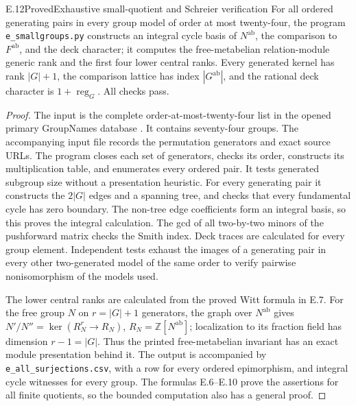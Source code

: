 \begin{statement}{E.12}{Proved}{Exhaustive small-quotient and Schreier verification}
For all ordered generating pairs in every group model of order
at most twenty-four, the program \texttt{e\_smallgroups.py}
constructs an integral cycle basis of $N^{\mathrm{ab}}$, the
comparison to $F^{\mathrm{ab}}$, and the deck character; it
computes the free-metabelian relation-module generic rank and
the first four lower central ranks. Every generated kernel has
rank $|G|+1$, the comparison lattice has index
$|G^{\mathrm{ab}}|$, and the rational deck character is
$1+\operatorname{reg}_G$. All checks pass.
\end{statement}
\begin{proof}
The input is the complete order-at-most-twenty-four list in the
opened primary GroupNames database \cite{E_GroupNames}.
It contains seventy-four groups. The accompanying input file
records the permutation generators and exact source URLs.
The program closes each set of generators, checks its order,
constructs its multiplication table, and enumerates every ordered
pair. It tests generated subgroup size without a presentation
heuristic. For every generating pair it constructs the $2|G|$
edges and a spanning tree, and checks that every fundamental
cycle has zero boundary. The non-tree edge coefficients form
an integral basis, so this proves the integral calculation.
The gcd of all two-by-two minors of the pushforward matrix
checks the Smith index. Deck traces are calculated for every
group element. Independent tests exhaust the images of a
generating pair in every other two-generated model of the same
order to verify pairwise nonisomorphism of the models used.

The lower central ranks are calculated from the proved Witt
formula in E.7. For the free group $N$ on $r=|G|+1$ generators,
the graph over $N^{\mathrm{ab}}$ gives
$N'/N''=\ker(R_N^r\to R_N)$, $R_N=\mathbb Z[N^{\mathrm{ab}}]$;
localization to its fraction field has dimension $r-1=|G|$.
Thus the printed free-metabelian invariant has an exact module
presentation behind it. The output is accompanied by
\texttt{e\_all\_surjections.csv}, with a row for every ordered
epimorphism, and integral cycle witnesses for every group.
The formulas E.6--E.10 prove the assertions for all finite
quotients, so the bounded computation also has a general proof.
\end{proof}

